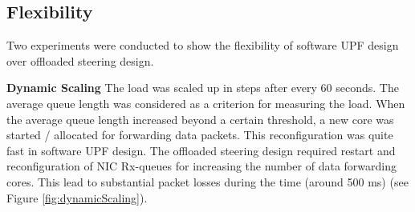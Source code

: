  \subsection{Flexibility}
 Two experiments were conducted to show the flexibility of software UPF design over offloaded steering design.

 \textbf{Dynamic Scaling} The load was scaled up in steps after every 60 seconds. The
  average queue length was considered as a criterion for measuring the load. When the
   average queue length increased beyond a certain threshold, a new core was started /
    allocated for forwarding data packets. This reconfiguration was quite fast in software UPF design. The offloaded steering design required restart and reconfiguration of NIC Rx-queues for increasing the number of data forwarding cores. This lead to substantial 
 packet losses during the time (around 500 ms) (see Figure \ref{fig:dynamicScaling}).
 

